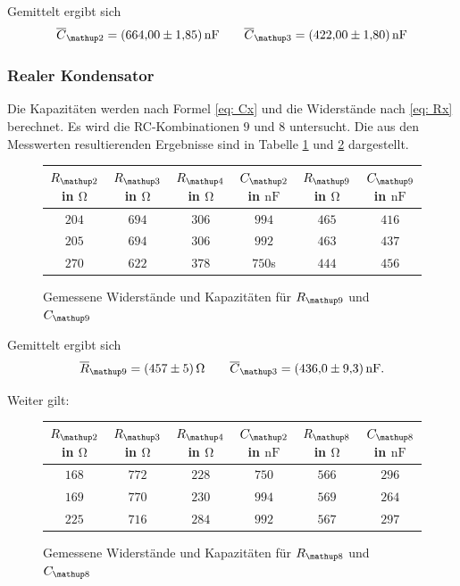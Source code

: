 Gemittelt ergibt sich
\begin{equation}
\label{eq:wert_c12_c_13}
\overline{C}_{\map{2}}=\SI{664\pm1.85}{\nano\farad} \qquad \overline{C}_{\map{3}}=\SI{422\pm1.80}{\nano\farad}
\end{equation}

\subsubsection{Realer Kondensator}

Die Kapazitäten werden nach Formel \eqref{eq: Cx} und die 
Widerstände nach \eqref{eq: Rx} berechnet.
Es wird die RC-Kombinationen $9$ und $8$ untersucht.
Die aus den Messwerten resultierenden Ergebnisse sind in Tabelle 
\ref{tab:rc_r9} und \ref{tab:rc_r8} dargestellt.

\begin{figure}
\centering
\caption{Gemessene Widerstände und Kapazitäten für $R\ua{9}$ und $C\ua{9}$}
  \label{tab:rc_r9}
\begin{tabular}{S S S S S S }
    \toprule
    {$R\ua{2}$ in $\si{\ohm}$} &  {$R\ua{3}$ in $\si{\ohm}$} & {$R\ua{4}$ in $\si{\ohm}$} & {$C\ua{2}$ in $\si{\nano\farad}$}& {$R\ua{9}$ in $\si{\ohm}$} &  {$C\ua{9}$ in $\si{\nano\farad}$} \\
    \midrule
     {$\num{204}$} & {$\num{694}$} &  {$\num{306}$}& {$\num{994}$}  &  {$\num{465}$} & {$\num{416}$}\\
     {$\num{205}$} & {$\num{694}$}  & {$\num{306}$} & {$\num{992}$} & {$\num{463}$} & {$\num{437}$}\\
     {$\num{270}$} & {$\num{622}$}  & {$\num{378}$} & {$\num{750}$s} &{$\num{444}$} & {$\num{456}$}  \\
 
     \bottomrule
  \end{tabular}
 \end{figure}
Gemittelt ergibt sich
\begin{equation}
\label{eq:wert_r9_c_9}
\overline{R}_{\map{9}}=\SI{457\pm5}{\ohm} \qquad \overline{C}_{\map{3}}=\SI{436\pm9.3}{\nano\farad}.
\end{equation}

Weiter gilt:

\begin{figure}
\centering
\caption{Gemessene Widerstände und Kapazitäten für $R\ua{8}$ und $C\ua{8}$}
  \label{tab:rc_r8}
  \begin{tabular}{S S S S S S}
  \toprule
    {$R\ua{2}$ in $\si{\ohm}$} &  {$R\ua{3}$ in $\si{\ohm}$} & {$R\ua{4}$ in $\si{\ohm}$} & {$C\ua{2}$ in $\si{\nano\farad}$}& {$R\ua{8}$ in $\si{\ohm}$} &  {$C\ua{8}$ in $\si{\nano\farad}$} \\
    \midrule
    {$\num{168}$} & {$\num{772}$} &  {$\num{228}$}& {$\num{750}$}  &  {$\num{566}$} & {$\num{296}$}\\
     {$\num{169}$} & {$\num{770}$}  & {$\num{230}$} & {$\num{994}$} & {$\num{569}$} & {$\num{264}$}\\
     {$\num{225}$} & {$\num{716}$}  & {$\num{284}$} & {$\num{992}$} &{$\num{567}$} & {$\num{297}$}  \\
     \bottomrule
    \end{tabular}
\end{figure}

